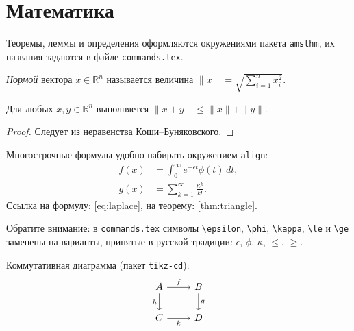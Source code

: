 
\section{Математика}

Теоремы, леммы и определения оформляются окружениями пакета \texttt{amsthm},
их названия задаются в файле \texttt{commands.tex}.

\begin{definition}\label{def:norm}
    \emph{Нормой} вектора $x \in \mathbb{R}^n$ называется величина
    $\|x\| = \sqrt{\sum_{i=1}^{n} x_i^2}$.
\end{definition}

\begin{theorem}\label{thm:triangle}
    Для любых $x, y \in \mathbb{R}^n$ выполняется $\|x + y\| \le \|x\| + \|y\|$.
\end{theorem}

\begin{proof}
    Следует из неравенства Коши--Буняковского.
\end{proof}

Многострочные формулы удобно набирать окружением \texttt{align}:
\begin{align}
    f(x) &= \int_{0}^{\infty} e^{-\epsilon t} \phi(t) \, dt, \label{eq:laplace} \\
    g(x) &= \sum_{k=1}^{\infty} \frac{\kappa^k}{k!}. \nonumber
\end{align}
Ссылка на формулу: \eqref{eq:laplace}, на теорему: \autoref{thm:triangle}.

Обратите внимание: в \texttt{commands.tex} символы \verb+\epsilon+, \verb+\phi+,
\verb+\kappa+, \verb+\le+ и \verb+\ge+ заменены на варианты, принятые
в русской традиции: $\epsilon$, $\phi$, $\kappa$, $\le$, $\ge$.

Коммутативная диаграмма (пакет \texttt{tikz-cd}):
\[
    \begin{tikzcd}
        A \arrow[r, "f"] \arrow[d, "h"'] & B \arrow[d, "g"] \\
        C \arrow[r, "k"']                & D
    \end{tikzcd}
\]
